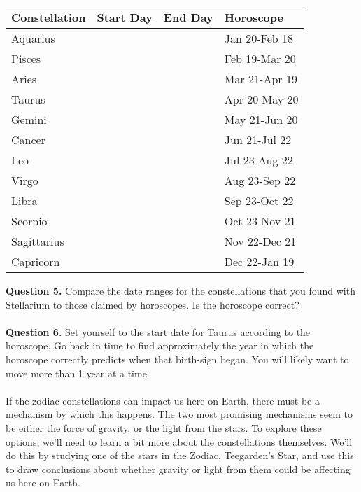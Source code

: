 \documentclass[11pt]{article}
\begin{document}
\begin{center}
	\begin{tabular}{|l|l|l|l|}
		\hline
		Constellation&Start Day&End Day&Horoscope\\ \hline
		Aquarius    & & &Jan 20-Feb 18\\ \hline
		Pisces      & & &Feb 19-Mar 20\\ \hline
		Aries       & & &Mar 21-Apr 19\\ \hline
		Taurus      & & &Apr 20-May 20\\ \hline
		Gemini      & & &May 21-Jun 20\\ \hline
		Cancer      & & &Jun 21-Jul 22\\ \hline
		Leo         & & &Jul 23-Aug 22\\ \hline	
		Virgo       & & &Aug 23-Sep 22\\ \hline
		Libra       & & &Sep 23-Oct 22\\ \hline
		Scorpio     & & &Oct 23-Nov 21\\ \hline
		Sagittarius & & &Nov 22-Dec 21\\ \hline
		Capricorn   & & &Dec 22-Jan 19\\
		\hline
	\end{tabular}
\end{center}

\textbf{Question 5.} Compare the date ranges for the constellations that you found with Stellarium to those claimed by horoscopes. Is the horoscope correct?\\

\vspace{1.5cm}
\hrulefill\\

\textbf{Question 6.} Set yourself to the start date for Taurus according to the horoscope. Go back in time to find approximately the year in which the horoscope correctly predicts when that birth-sign began. You will likely want to move more than 1 year at a time.\\

\vspace{1.5cm}
\hrulefill\\

If the zodiac constellations can impact us here on Earth, there must be a mechanism by which this happens. The two most promising mechanisms seem to be either the force of gravity, or the light from the stars. To explore these options, we'll need to learn a bit more about the constellations themselves. We'll do this by studying one of the stars in the Zodiac, Teegarden's Star, and use this to draw conclusions about whether gravity or light from them could be affecting us here on Earth.\\
\end{document}
